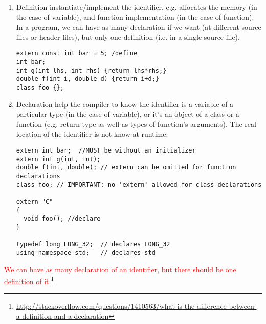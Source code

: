 \begin{enumerate}
  \item Definition instantiate/implement the identifier, e.g. allocates the
  memory (in the case of variable), and function implementation (in the case of
  function). In a program, we can have as many declaration if we want (at
  different source files or header files), but only one definition (i.e. in a
  single source file).
  
\begin{verbatim}
extern const int bar = 5; /define 
int bar;
int g(int lhs, int rhs) {return lhs*rhs;}
double f(int i, double d) {return i+d;}
class foo {};
\end{verbatim} 


  \item Declaration help the compiler to know the identifier is a variable of
  a particular type (in the case of variable), or it's an object of a class
  or a function (e.g. return type as well as types of function's arguments).
  The real location of the identifier is not know at runtime.
    
\begin{verbatim}
extern int bar;  //MUST be without an initializer
extern int g(int, int);
double f(int, double); // extern can be omitted for function declarations
class foo; // IMPORTANT: no 'extern' allowed for class declarations

extern "C"
{
  void foo(); //declare
}

typedef long LONG_32;  // declares LONG_32
using namespace std;   // declares std

\end{verbatim}

\end{enumerate}
\textcolor{red}{We can have as many declaration of an identifier, but there
should be one definition of
it}.\footnote{\url{http://stackoverflow.com/questions/1410563/what-is-the-difference-between-a-definition-and-a-declaration}}

